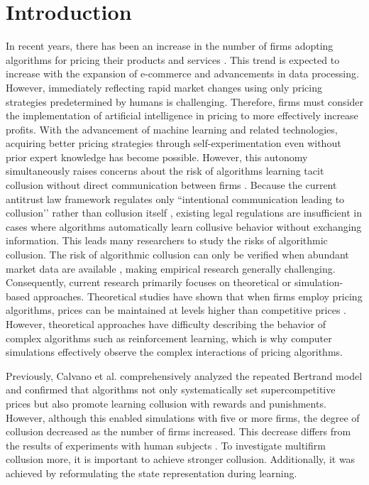 \documentclass[runningheads]{llncs}
\begin{document}
\section{Introduction}
    In recent years, there has been an increase in the number of firms adopting algorithms for pricing their products and services \cite{Chen2016}.
    This trend is expected to increase with the expansion of e-commerce and advancements in data processing.
    However, immediately reflecting rapid market changes using only pricing strategies predetermined by humans is challenging. Therefore, firms must consider the implementation of artificial intelligence in pricing to more effectively increase profits.
    With the advancement of machine learning and related technologies, acquiring better pricing strategies through self-experimentation even without prior expert knowledge has become possible.
    However, this autonomy simultaneously raises concerns about the risk of algorithms learning tacit collusion without direct communication between firms \cite{mehra2016}.
    Because the current antitrust law framework regulates only ``intentional communication leading to collusion’’ rather than collusion itself \cite{calvano2020b,harrington2019}, existing legal regulations are insufficient in cases where algorithms automatically learn collusive behavior without exchanging information.
    This leads many researchers to study the risks of algorithmic collusion.
    The risk of algorithmic collusion can only be verified when abundant market data are available \cite{assad2020}, making empirical research generally challenging.
    Consequently, current research primarily focuses on theoretical or simulation-based approaches.
    Theoretical studies have shown that when firms employ pricing algorithms, prices can be maintained at levels higher than competitive prices \cite{brown2021,salcedo2015}.
    However, theoretical approaches have difficulty describing the behavior of complex algorithms such as reinforcement learning, which is why computer simulations effectively observe the complex interactions of pricing algorithms.

Previously, Calvano et al. \cite{calvano2020a} comprehensively analyzed the repeated Bertrand model and confirmed that algorithms not only systematically set supercompetitive prices but also promote learning collusion with rewards and punishments. However, although this enabled simulations with five or more firms, the degree of collusion decreased as the number of firms increased. This decrease differs from the results of experiments with human subjects \cite{Potters2013}. To investigate multifirm collusion more, it is important to achieve stronger collusion. Additionally, it was achieved by reformulating the state representation during learning.
\end{document}
